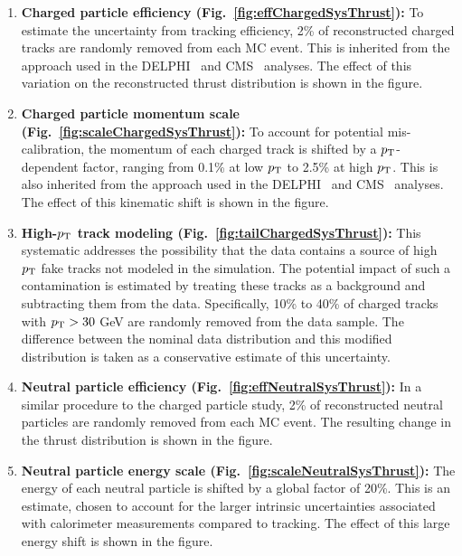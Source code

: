\documentclass[a4paper,11pt]{article}
\begin{document}
\begin{enumerate}
    \item \textbf{Charged particle efficiency (Fig.~\ref{fig:effChargedSysThrust}):} To estimate the uncertainty from tracking efficiency, 2\% of reconstructed charged tracks are randomly removed from each MC event. This is inherited from the approach used in the DELPHI~\cite{DELPHI:2000uri} and CMS~\cite{CMS:2024mlf} analyses. The effect of this variation on the reconstructed thrust distribution is shown in the figure.

    \item \textbf{Charged particle momentum scale (Fig.~\ref{fig:scaleChargedSysThrust}):} To account for potential mis-calibration, the momentum of each charged track is shifted by a $p_{\rm T}$-dependent factor, ranging from 0.1\% at low $p_{\rm T}$ to 2.5\% at high $p_{\rm T}$. This is also inherited from the approach used in the DELPHI~\cite{DELPHI:2000uri} and CMS~\cite{CMS:2024mlf} analyses. The effect of this kinematic shift is shown in the figure.

    \item \textbf{High-$p_{\rm T}$ track modeling (Fig.~\ref{fig:tailChargedSysThrust}):} This systematic addresses the possibility that the data contains a source of high $p_{\rm T}$ fake tracks not modeled in the simulation. The potential impact of such a contamination is estimated by treating these tracks as a background and subtracting them from the data. Specifically, 10\% to 40\% of charged tracks with $p_{\rm T}>30$ GeV are randomly removed from the data sample. The difference between the nominal data distribution and this modified distribution is taken as a conservative estimate of this uncertainty.

    \item \textbf{Neutral particle efficiency (Fig.~\ref{fig:effNeutralSysThrust}):} In a similar procedure to the charged particle study, 2\% of reconstructed neutral particles are randomly removed from each MC event. The resulting change in the thrust distribution is shown in the figure. 

    \item \textbf{Neutral particle energy scale (Fig.~\ref{fig:scaleNeutralSysThrust}):} The energy of each neutral particle is shifted by a global factor of 20\%. This is an estimate, chosen to account for the larger intrinsic uncertainties associated with calorimeter measurements compared to tracking. The effect of this large energy shift is shown in the figure.
\end{enumerate}
\end{document}
